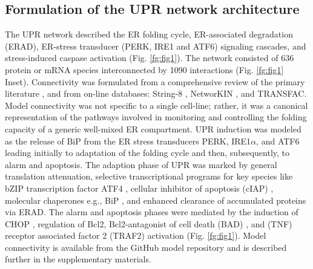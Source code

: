 \documentclass[fleqn,10pt]{wlscirep}
\begin{document}
\subsection*{Formulation of the UPR network architecture}
The UPR network described the ER folding cycle, ER-associated degradation (ERAD), ER-stress transducer (PERK, IRE1 and ATF6) signaling cascades, and stress-induced caspase activation (Fig. \ref{fg:fig1}).
The network consisted of 636 protein or mRNA species interconnected by 1090 interactions (Fig. \ref{fg:fig1} Inset).
Connectivity was formulated from a comprehensive review of the primary literature  \cite{naidoo2009er, ron2002translational, kaufman2002unfolded,ellgaard2003qce,Fonseca:2009fk,Schroder:2005vn,gotoh:hdc,mccullough2001gsc, belmont2008cga,Hetz:2009qc,Urano:2000uq,szegezdi2006mediators}, and from on-line databases: String-8 \cite{Jensen:2009fk}, NetworKIN \cite{Linding:2007fk}, and TRANSFAC.
Model connectivity was not specific to a single cell-line; rather, it was a canonical representation of the pathways involved in monitoring and controlling the folding capacity of a generic well-mixed ER compartment.
UPR induction was modeled as the release of BiP from the ER stress transducers PERK, IRE1$\alpha$, and ATF6 leading initially to adaptation of the folding cycle and then, subsequently, to alarm and apoptosis.
The adaption phase of UPR was marked by general translation attenuation, selective transcriptional programs for key species like bZIP transcription factor ATF4 \cite{lu2004tra}, cellular inhibitor of apoptosis (cIAP) \cite{hamanaka2008pdr}, molecular chaperones e.g., BiP \cite{harding2003isr}, and enhanced clearance of accumulated proteins via ERAD.
The alarm and apoptosis phases were mediated by the induction of CHOP \cite{ron1992cnd}, regulation of Bcl2, Bcl2-antagonist of cell death (BAD) \cite {wang1999cia}, and (TNF) receptor associated factor 2 (TRAF2) \cite{lei2003jpb,putcha2003jmb, yamamoto1999bpa, szegezdi2006mediators} activation (Fig. \ref{fg:fig1}).
Model connectivity is available from the GitHub model repository and is described further in the supplementary materials.



\end{document}
